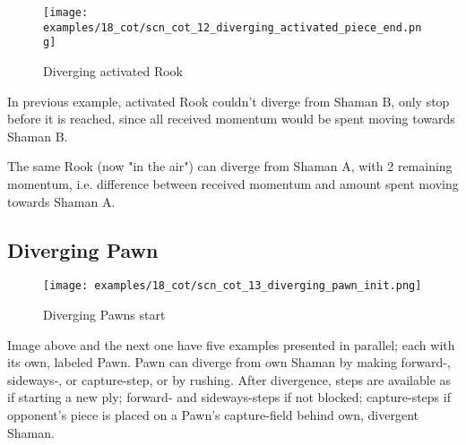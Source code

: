 \clearpage %

\vspace*{-2.1\baselineskip}
\noindent
\begin{figure}[!h]
\texttt{[image: examples/18\_cot/scn\_cot\_12\_diverging\_activated\_piece\_end.png]}
\vspace*{-1.3\baselineskip}
\caption{Diverging activated Rook}
\label{fig:scn_cot_12_diverging_activated_piece_end}
\end{figure}

\vspace*{-0.4\baselineskip}
In previous example, activated Rook couldn't diverge from Shaman B, only stop before
it is reached, since all received momentum would be spent moving towards Shaman B.

The same Rook (now "in the air") can diverge from Shaman A, with 2 remaining momentum,
i.e. difference between received momentum and amount spent moving towards Shaman A.

\clearpage %

\subsection*{Diverging Pawn}
\label{sec:Conquest of Tlalocan/Divergence/Diverging Pawn/2} %

\vspace*{-1.4\baselineskip}
\noindent
\begin{figure}[!h]
\texttt{[image: examples/18\_cot/scn\_cot\_13\_diverging\_pawn\_init.png]}
\vspace*{-1.3\baselineskip}
\caption{Diverging Pawns start}
\label{fig:scn_cot_13_diverging_pawn_init}
\end{figure}

\vspace*{-0.5\baselineskip}
Image above and the next one have five examples presented in parallel; each with
its own, labeled Pawn. \newline
\indent
Pawn can diverge from own Shaman by making forward-, sideways-, or capture-step,
or by rushing. After divergence, steps are available as if starting a new ply;
forward- and sideways-steps if not blocked; capture-steps if opponent's piece is
placed on a Pawn's capture-field behind own, divergent Shaman.

